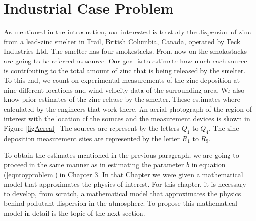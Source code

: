 \documentclass[12pt]{book}
\begin{document}



\chapter{Industrial Case Problem}



As mentioned in the introduction, our interested is to study
the dispersion of zinc from a lead-zinc smelter in Trail, British Columbia, Canada,
operated by Teck Industries Ltd.  The smelter has four smokestacks. From now
on the smokestacks are going to be referred as source. Our goal
is to estimate how much  each source is contributing to the total amount of zinc
that is being released by the smelter.
To this end, we count on experimental
measurements of the zinc deposition at nine different locations and wind velocity data 
of the surrounding area. We also know prior estimates of the zinc release by the smelter.
These estimates where calculated by the engineers that work there.
An aerial photograph of the region  of interest with 
the location of the sources and the measurement devices is shown 
in Figure \ref{figAereal}. The sources are represent by the letters
$Q_{1}$ to $Q_{4}$. The zinc deposition measurement sites are represented
by the letter $R_{1}$ to $R_{9}$. 

To obtain the estimates mentioned in the previous paragraph, we are going
to proceed in the same manner as in estimating the parameter $b$ in equation (\ref{eqntoyproblem})
in Chapter 3. In that Chapter we were given  a mathematical model that approximates
the physics of interest. For this chapter, it is necessary to develop, from scratch,
a mathematical model that approximates the physics behind pollutant dispersion in the
atmosphere. To propose this mathematical model in detail is the topic of the next section.
\end{document}
